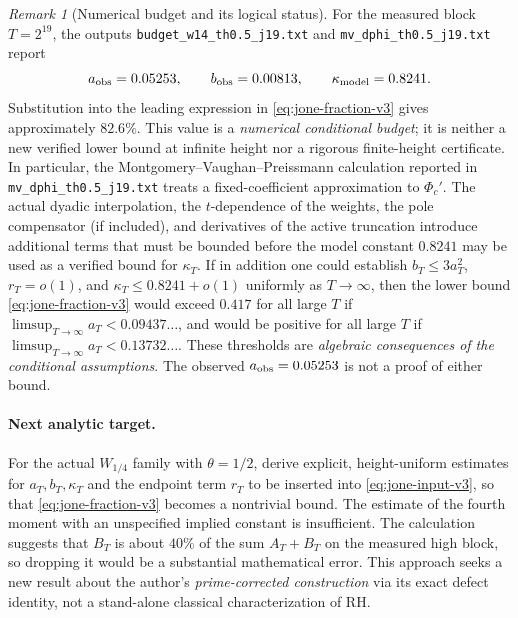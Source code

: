 \documentclass[11pt,a4paper]{article}
\numberwithin{equation}{section}
\theoremstyle{definition}
\theoremstyle{remark}
\newtheorem{remark}[theorem]{Remark}
\begin{document}
\begin{remark}[Numerical budget and its logical status]\label{rem:jone-budget-v3}
For the measured block $T=2^{19}$, the outputs
\texttt{budget\_w14\_th0.5\_j19.txt} and
\texttt{mv\_dphi\_th0.5\_j19.txt} report
\begin{equation}
 a_{\rm obs}=0.05253,\qquad b_{\rm obs}=0.00813,
\qquad\kappa_{\rm model}=0.8241.
\end{equation}
Substitution into the leading expression in
\eqref{eq:jone-fraction-v3} gives approximately $82.6\%$.
This value is a \emph{numerical conditional budget}; it is neither a
new verified lower bound at infinite height nor a rigorous finite-height
certificate. In particular, the Montgomery--Vaughan--Preissmann
calculation reported in \texttt{mv\_dphi\_th0.5\_j19.txt} treats a fixed-coefficient approximation to $\Phi_c'$.
The actual dyadic interpolation, the $t$-dependence of the weights,
the pole compensator (if included), and derivatives of the active
truncation introduce additional terms that must be bounded before the model
constant $0.8241$ may be used as a verified bound for $\kappa_T$.
If in addition one could establish $b_T\le3a_T^2$, $r_T=o(1)$,
and $\kappa_T\le0.8241+o(1)$ uniformly as $T\to\infty$,
then the lower bound \eqref{eq:jone-fraction-v3} would exceed $0.417$ for all large $T$ if
$\limsup_{T\to\infty}a_T<0.09437\ldots$, and would be positive for all large $T$
if $\limsup_{T\to\infty}a_T<0.13732\ldots$. These thresholds are
\emph{algebraic consequences of the conditional assumptions}.
The observed $a_{\rm obs}=0.05253$ is not a proof of either bound.
\end{remark}

\paragraph{Next analytic target.}
For the actual $W_{1/4}$ family with $\theta=1/2$, derive explicit,
height-uniform estimates for $a_T,b_T,\kappa_T$ and the endpoint term
$r_T$ to be inserted into \eqref{eq:jone-input-v3}, so that \eqref{eq:jone-fraction-v3} becomes a nontrivial bound. The estimate of the
fourth moment with an unspecified implied constant is insufficient.
The calculation suggests that $B_T$ is about $40\%$ of the sum
$A_T+B_T$ on the measured high block, so dropping it would be a
substantial mathematical error. This approach seeks a new result about
the author's \emph{prime-corrected construction} via its exact defect
identity, not a stand-alone classical characterization of RH.
\end{document}
